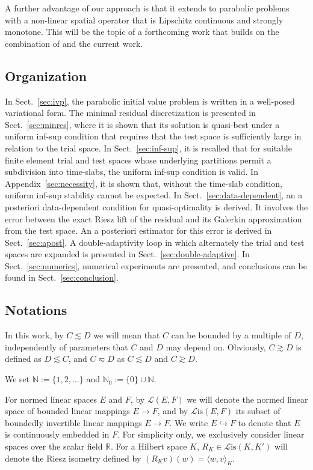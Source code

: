 \documentclass{amsart}
\numberwithin{equation}{section}
\newcommand{\R}{\mathbb R}
\newcommand{\N}{\mathbb N}
\newcommand{\cL}{\mathcal L}
\newcommand{\Lis}{\cL\mathrm{is}}
\newcommand{\1}{\mathbb 1}
\begin{document}
A further advantage of our approach is that it extends to parabolic problems with a non-linear spatial operator that is Lipschitz continuous and strongly monotone. This will be the topic of a forthcoming work that builds on the combination of \cite{19.98} and the current work. 

\subsection{Organization}
In Sect.~\ref{sec:ivp}, the parabolic initial value problem is written in a well-posed variational form. The minimal residual discretization is presented in Sect.~\ref{sec:minres}, where it is shown that its solution is quasi-best under a uniform inf-sup condition that requires that the test space is sufficiently large in relation to the trial space.
In Sect.~\ref{sec:inf-sup}, it is recalled that for suitable finite element trial and test spaces whose underlying partitions permit a subdivision into time-slabs, the uniform inf-sup condition is valid. In Appendix~\ref{sec:necessity}, it is shown that, without the time-slab condition, uniform inf-sup stability cannot be expected.
In Sect.~\ref{sec:data-dependent}, an a posteriori data-dependent condition for quasi-optimality is derived.
It involves the error between the exact Riesz lift of the residual and its Galerkin approximation from the test space. An a posteriori estimator for this error is derived in Sect.~\ref{sec:apost}. A double-adaptivity loop in which alternately the trial and test spaces are expanded is presented in Sect.~\ref{sec:double-adaptive}.
In Sect.~\ref{sec:numerics}, numerical experiments are presented, and conclusions can be found in Sect.~\ref{sec:conclusion}.


\subsection{Notations}  \label{sec:notations}
In this work, by $C \lesssim D$ we will mean that $C$ can be bounded by a multiple of $D$, independently of parameters that $C$ and $D$ may depend on.
Obviously, $C \gtrsim D$ is defined as $D \lesssim C$, and $C\eqsim D$ as $C\lesssim D$ and $C \gtrsim D$. 

We set $\N:=\{1,2,\ldots\}$ and $\N_0:=\{0\} \cup \N$.

For normed linear spaces $E$ and $F$, by $\cL(E,F)$ we will denote the normed linear space of bounded linear mappings $E \rightarrow F$,
and by $\Lis(E,F)$ its subset of boundedly invertible linear mappings $E \rightarrow F$.
We write $E \hookrightarrow F$ to denote that $E$ is continuously embedded in $F$.
For simplicity only, we exclusively consider linear spaces over the scalar field $\R$.
For a Hilbert space $K$, $R_K\in \Lis(K,K')$ will denote the Riesz isometry defined by $(R_K v)(w)=\langle w,v\rangle_K$.
\end{document}
